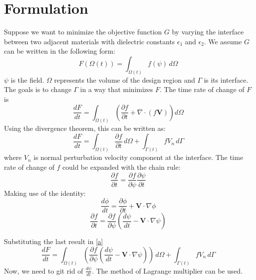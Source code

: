 \documentclass{tufte-handout}
\begin{document}
\section{Formulation}
Suppose we want to minimize the objective function $G$ by varying the interface between two adjacent materials with dielectric constants $\epsilon_1$ and $\epsilon_2$. We assume  $G$ can be written in the following form:
\begin{equation}
F(\Omega(t)) = \int_{\Omega(t)} f(\psi) \, d\Omega
\end{equation} 
$\psi$ is the field. $\Omega$ represents the volume of the design region and $\Gamma$ is its interface. The goals is to change $\Gamma$  in a way that minimizes $F$. 
The time rate of change of $F$ is
\begin{equation}
\frac{d F}{d t} = \int_{\Omega(t)} \left( \frac{\partial f}{\partial t} + \nabla \cdot (f \boldsymbol{V})  \right) d\Omega
\end{equation}
Using the divergence theorem, this can be written as:
\begin{equation}\label{a}
\frac{d F}{d t} =  \int_{\Omega(t)} \frac{\partial f}{\partial t} \,  d\Omega + \int_{\Gamma(t)}  f V_n \,  d\Gamma
\end{equation}
where $V_n$ is normal perturbation velocity component at the interface. The time rate of change of $f$ could be expanded with the chain rule:
\begin{equation}
 \frac{\partial f}{\partial t} =  \frac{\partial f}{\partial \psi}   \frac{\partial \psi}{\partial t}
\end{equation}
Making use of the identity: 
\begin{equation}
\frac{d \phi}{d t} = \frac{\partial \phi}{\partial t}
+ \boldsymbol{V}  \cdot \nabla \phi
\end{equation}
\begin{equation}
\frac{\partial f}{\partial t} =  \frac{\partial f}{\partial \psi}  \left(  \frac{d \psi}{d t}
- \boldsymbol{V}  \cdot \nabla \psi \right) 
\end{equation}

Substituting the last result in \ref{a}
\begin{equation}
\frac{d F}{d t} =  \int_{\Omega(t)} \left(\frac{\partial f}{\partial \psi}  \left(  \frac{d \psi}{d t}
- \boldsymbol{V}  \cdot \nabla \psi \right) \right)  \,  d\Omega + \int_{\Gamma(t)}  f V_n \,  d\Gamma
\end{equation}
Now, we need to git rid of $\frac{d \psi}{d t}$.  The method of Lagrange multiplier can be used.
\end{document}
